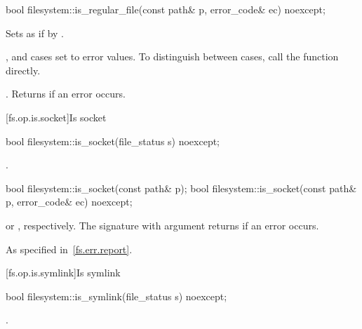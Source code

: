 %
\begin{itemdecl}
bool filesystem::is_regular_file(const path& p, error_code& ec) noexcept;
\end{itemdecl}

\begin{itemdescr}
\pnum
\effects
Sets  as if by .
\begin{note}
,  and
   cases set  to error values. To distinguish between cases, call the  function directly.
\end{note}

\pnum
\returns
{}.
Returns  if an error occurs.
\end{itemdescr}


[fs.op.is.socket]{Is socket}

%
\begin{itemdecl}
bool filesystem::is_socket(file_status s) noexcept;
\end{itemdecl}

\begin{itemdescr}
\pnum
\returns
{}.
\end{itemdescr}

%
\begin{itemdecl}
bool filesystem::is_socket(const path& p);
bool filesystem::is_socket(const path& p, error_code& ec) noexcept;
\end{itemdecl}

\begin{itemdescr}
\pnum
\returns
{} or
  , respectively. The signature with argument
   returns  if an error occurs.

\pnum
\throws
As specified in~\ref{fs.err.report}.
\end{itemdescr}


[fs.op.is.symlink]{Is symlink}

%
\begin{itemdecl}
bool filesystem::is_symlink(file_status s) noexcept;
\end{itemdecl}

\begin{itemdescr}
\pnum
\returns
{}.
\end{itemdescr}

